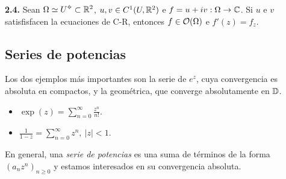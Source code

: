 
\begin{theorem}
    \textbf{2.4.} Sean \(\Omega \simeq U\ab\subset \R^2\), \(u,v \in C^1(U, \mathbb{R}^2)\) e \(f = u+ iv :  \Omega \to \mathbb{C} \). Si \(u\) e \( v\) satisfisfacen la ecuaciones de C-R, entonces \(f\in \mathcal{O}(\Omega)\) e \(f'(z) = f_z\). 
\end{theorem}

\subsection*{Series de potencias}

Los dos ejemplos más importantes son la serie de \(e^z\), cuya convergencia es absoluta en compactos, y la geométrica, que converge absolutamente en \(\mathbb{D}\).  
\begin{itemize}
    \item \(\displaystyle \exp(z) = \sum_{n=0}^\infty \frac{z^n}{n!}\).  
    \item \(\displaystyle \frac{1}{1-z} = \sum_{n=0}^\infty z^n, \ |z| <1\). 
\end{itemize}
En general, una \emph{serie de potencias} es una suma de términos de la forma \( (a_nz^n)_{n\geq 0 }  \) y estamos interesados en su convergencia absoluta.  


